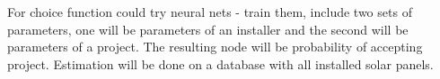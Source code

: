 
\begin{DoxyRefList}
\item[\label{wp__wp000001}%
\hypertarget{wp__wp000001}{}%
Class \hyperlink{classsolar__core_1_1_s_e_i}{solar\+\_\+core\+:\+:S\+E\+I} ]For choice function could try neural nets -\/ train them, include two sets of parameters, one will be parameters of an installer and the second will be parameters of a project. The resulting node will be probability of accepting project. Estimation will be done on a database with all installed solar panels.
\end{DoxyRefList}